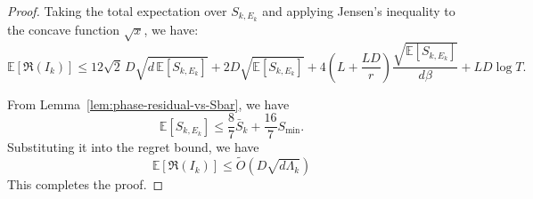 \documentclass[journal,onecolumn]{IEEEtran}
\theoremstyle{plain}
\theoremstyle{definition}
\theoremstyle{remark}
\newcommand{\regret}{\mathfrak{R}}
\begin{document}
{\begin{proof}
    Taking the total expectation over $S_{k,E_k}$ and applying Jensen's inequality to the concave function $\sqrt{x}$,
    we have:
    \begin{equation*}
        \mathbb{E}[\regret(I_{k})] \le 12\sqrt{2}\, D\sqrt{d\,\mathbb{E}[S_{k,E_k}]}
        + 2 D\sqrt{\mathbb{E}[S_{k,E_k}]}+4\left(L+\frac{LD}{r}\right)\frac{\sqrt{\mathbb{E}[S_{k,E_k}]}}{d\beta}+LD\log T.
    \end{equation*}

    From Lemma~\ref{lem:phase-residual-vs-Sbar}, we have
    \begin{equation*}
        \mathbb{E}[S_{k,E_k}] \le \frac87\bar S_k+\frac{16}{7}S_{\min}. 
    \end{equation*}
    Substituting it into the regret bound, we have 
    \begin{equation*}
        \mathbb{E}[\regret(I_{k})] \le \widetilde{O}\left(D\sqrt{d\Lambda_k}\right)
    \end{equation*}
    This completes the proof.
\end{proof}

}
\end{document}
